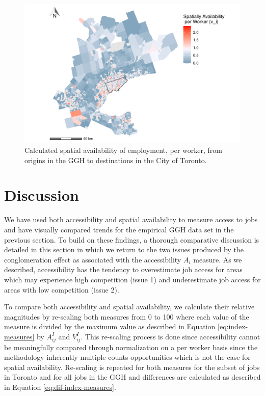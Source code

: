 \documentclass[]{elsarticle} %
\begin{document}
\begin{figure}
\includegraphics[width=1\linewidth]{Spatial-Availability_files/figure-latex/plot-avail-GGH-TTS-per-worker-1} \caption{\label{fig:plot-avail-GGH-TTS-per-worker}Calculated spatial availability of employment, per worker, from origins in the GGH to destinations in the City of Toronto.}\label{fig:plot-avail-GGH-TTS-per-worker}
\end{figure}
\newpage

\hypertarget{discussion}{%
\section{Discussion}\label{discussion}}

We have used both accessibility and spatial availability to measure
access to jobs and have visually compared trends for the empirical GGH
data set in the previous section. To build on these findings, a thorough
comparative discussion is detailed in this section in which we return to
the two issues produced by the conglomeration effect as associated with
the accessibility \(A_i\) measure. As we described, accessibility has
the tendency to overestimate job access for areas which may experience
high competition (issue 1) and underestimate job access for areas with
low competition (issue 2).

To compare both accessibility and spatial availability, we calculate
their relative magnitudes by re-scaling both measures from 0 to 100
where each value of the measure is divided by the maximum value as
described in Equation \ref{eq:index-measures} by \(A^I_{ij}\) and
\(V^I_{ij}\). This re-scaling process is done since accessibility cannot
be meaningfully compared through normalization on a per worker basis
since the methodology inherently multiple-counts opportunities which is
not the case for spatial availability. Re-scaling is repeated for both
measures for the subset of jobs in Toronto and for all jobs in the GGH
and differences are calculated as described in Equation
\ref{eq:dif-index-measures}.
\end{document}
